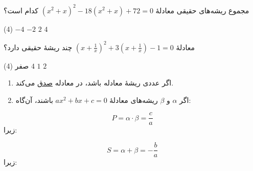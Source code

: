 
\begin{example}
    مجموع ریشه‌های حقیقی معادلۀ
    \((x^2+x)^2-18(x^2+x)+72=0\)
    کدام است؟

    \begin{tasks}(4)
        \task \(-4\)
        \task \(-2\)
        \task \(2\)
        \task \(4\)
    \end{tasks}
\end{example}

\vspace{0.6\baselineskip}


\begin{example}
    معادلۀ
    $\left(x+\frac{1}{x}\right)^2+3\left(x+\frac{1}{x}\right)-1=0$
    چند ریشۀ حقیقی دارد؟

    \begin{tasks}(4)
        \task صفر
        \task \(4\)
        \task \(1\)
        \task \(2\)
    \end{tasks}
\end{example}

\vspace{0.4\baselineskip}


\begin{remark}[توجه]
    \begin{enumerate}[label=\arabic*]
        \item اگر عددی ریشۀ معادله باشد، در معادله \underline{صدق} می‌کند.

        \item اگر \(\alpha\) و \(\beta\) ریشه‌های معادلۀ
        \(ax^2+bx+c=0\) باشند، آن‌گاه:
    \end{enumerate}
\end{remark}

\begin{minipage}[c]{0.44\textwidth}
    \centering
    \[
        P=\alpha\cdot\beta=\frac{c}{a}
    \]
    \raggedleft
    زیرا:
\end{minipage}
\hfill
\begin{minipage}[c]{0.44\textwidth}
    \centering
    \[
        S=\alpha+\beta=-\frac{b}{a}
    \]
    \raggedleft
    زیرا:
\end{minipage}

